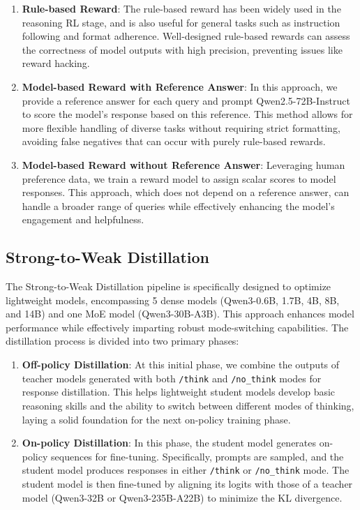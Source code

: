 \begin{enumerate}[label=(\arabic*)]
    \item \textbf{Rule-based Reward}: The rule-based reward has been widely used in the reasoning RL stage, and is also useful for general tasks such as instruction following \citep{tulu3} and format adherence. Well-designed rule-based rewards can assess the correctness of model outputs with high precision, preventing issues like reward hacking.
    \item \textbf{Model-based Reward with Reference Answer}: In this approach, we provide a reference answer for each query and prompt Qwen2.5-72B-Instruct to score the model's response based on this reference. This method allows for more flexible handling of diverse tasks without requiring strict formatting, avoiding false negatives that can occur with purely rule-based rewards.
    \item \textbf{Model-based Reward without Reference Answer}: Leveraging human preference data, we train a reward model to assign scalar scores to model responses. This approach, which does not depend on a reference answer, can handle a broader range of queries while effectively enhancing the model's engagement and helpfulness.
\end{enumerate}



\subsection{Strong-to-Weak Distillation}

The Strong-to-Weak Distillation pipeline is specifically designed to optimize lightweight models, encompassing 5 dense models (Qwen3-0.6B, 1.7B, 4B, 8B, and 14B) and one MoE model (Qwen3-30B-A3B). This approach enhances model performance while effectively imparting robust mode-switching capabilities. The distillation process is divided into two primary phases:

\begin{enumerate}[label=(\arabic*)]
\item \textbf{Off-policy Distillation}: 
At this initial phase, we combine the outputs of teacher models generated with both \texttt{/think} and \texttt{/no\_think} modes for response distillation. This helps lightweight student models develop basic reasoning skills and the ability to switch between different modes of thinking, laying a solid foundation for the next on-policy training phase.

\item \textbf{On-policy Distillation}: 
In this phase, the student model generates on-policy sequences for fine-tuning. Specifically, prompts are sampled, and the student model produces responses in either \texttt{/think} or \texttt{/no\_think} mode. The student model is then fine-tuned by aligning its logits with those of a teacher model (Qwen3-32B or Qwen3-235B-A22B) to minimize the KL divergence.


\end{enumerate}


